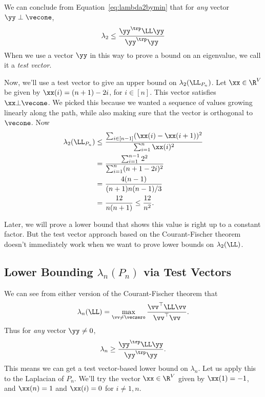 We can conclude from Equation~\eqref{eq:lambda2bymin} that for \emph{any} vector $\yy \perp \vecone$,
\begin{align*}
\lambda_2 \leq \frac{ \yy^\trp \LL \yy}{ \yy^\trp \yy}
\end{align*}
When we use a vector $\yy$ in this way to prove a bound on an eigenvalue, we call it a \emph{test vector}.

Now, we'll use a test vector to give an upper bound on $\lambda_2(\LL_{P_n})$.
Let $\xx \in \R^V$ be given by $\xx ( i ) = ( n + 1 ) - 2 i$, for $i
\in [n]$. This vector satisfies $\xx \bot \vecone$.
We picked this because we wanted a sequence of values growing linearly along
the path, while also making sure that the vector is orthogonal to
$\vecone$.
Now
\begin{align*}
\lambda_2(\LL_{P_n})
\leq & ~ \frac{ \sum_{i \in [n-1]} ( \xx(i) - \xx(i+1) )^2  }{ \sum_{i=1}^n \xx(i)^2 } \\
= & ~ \frac{ \sum_{i=1}^{n-1} 2^2 }{ \sum_{i=1}^n ( n + 1 - 2 i )^2 } \\
= & ~ \frac{ 4 ( n - 1 ) }{ ( n + 1 ) n ( n - 1 ) / 3 } \\
= & ~ \frac{ 12 } { n ( n + 1 ) } \leq \frac{ 12 } { n^2 }.
\end{align*}

Later, we will prove a lower bound that shows this value is right up
to a constant factor.
But the test vector approach based on the Courant-Fischer theorem
doesn't immediately work
when we want to prove lower bounds on $\lambda_2(\LL)$.

\subsection{Lower Bounding $\lambda_n(P_n)$ via Test Vectors} 

We can see from either version of the Courant-Fischer theorem that
\begin{align}
  \label{eq:lambdanbymax}
\lambda_n(\LL) = \max_{ \substack{ \vv \neq \veczero} } \frac{ \vv^\top \LL \vv}{ \vv^\top \vv}.
\end{align}
Thus for \emph{any} vector $\yy \neq 0$,
\begin{align*}
\lambda_n \geq \frac{ \yy^\trp \LL \yy}{ \yy^\trp \yy}.
\end{align*}
This means we can get a test vector-based lower bound on $\lambda_n$.
Let us apply this to the Laplacian of $P_n$.
We'll try the vector $\xx \in \R^V$ given by $\xx ( 1 ) = -1$,
and $\xx(n) = 1$ and $\xx(i) = 0$ for $i \neq 1,n$.

